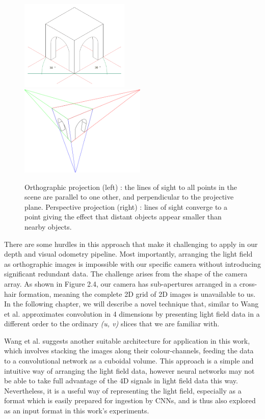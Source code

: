 \begin{figure}
    \centering 
    \includegraphics[height=1.7in]{images/orthographic.png}
    \includegraphics[height=1.7in]{images/perspective.png}
    \caption{Orthographic projection (left) \cite{behrendt2006isometric}: the lines of sight to all points in the scene are parallel to one other, and perpendicular to the projective plane. Perspective projection (right) \cite{gothe2009perspective}: lines of sight converge to a point giving the effect that distant objects appear smaller than nearby objects.}
\end{figure}

There are some hurdles in this approach that make it challenging to apply in our depth and visual odometry pipeline. Most importantly, arranging the light field as orthographic images is impossible with our specific camera without introducing significant redundant data. The challenge arises from the shape of the camera array. As shown in Figure 2.4, our camera has sub-apertures arranged in a cross-hair formation, meaning the complete 2D grid of 2D images is unavailable to us. In the following chapter, we will describe a novel technique that, similar to Wang et al. approximates convolution in 4 dimensions by presenting light field data in a different order to the ordinary \textit{(u, v)} slices that we are familiar with.

Wang et al. suggests another suitable architecture for application in this work, which involves stacking the images along their colour-channels, feeding the data to a convolutional network as a cuboidal volume. This approach is a simple and intuitive way of arranging the light field data, however neural networks may not be able to take full advantage of the 4D signals in light field data this way. Nevertheless, it is a useful way of representing the light field, especially as a format which is easily prepared for ingestion by CNNs, and is thus also explored as an input format in this work's experiments.


